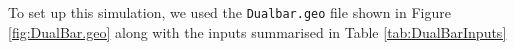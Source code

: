 To set up this simulation, we used the \texttt{Dualbar.geo} file shown in Figure \ref{fig:DualBar.geo} along with the inputs summarised in Table \ref{tab:DualBarInputs}
